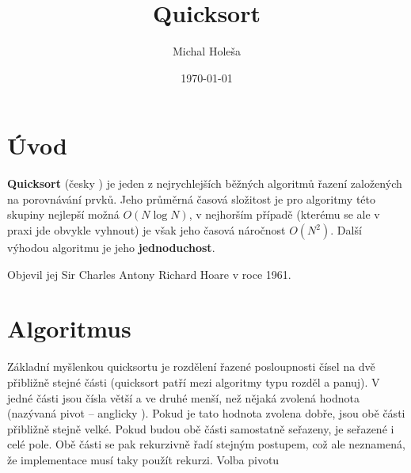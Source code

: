 \documentclass{article}
\title{Quicksort}
\author{Michal Holeša}  %
\date{\today}
\begin{document}
\maketitle


\section{Úvod}
\textbf{Quicksort} (česky ) je jeden z nejrychlejších běžných algoritmů řazení založených na porovnávání prvků. Jeho průměrná časová složitost je pro algoritmy této skupiny nejlepší možná $O(N \log N)$, v nejhorším případě (kterému se ale v praxi jde obvykle vyhnout) je však jeho časová náročnost $O(N^{2})$. Další výhodou algoritmu je jeho \textbf{jednoduchost}.

Objevil jej Sir Charles Antony Richard Hoare v roce 1961.

\section{Algoritmus}
Základní myšlenkou quicksortu je rozdělení řazené posloupnosti čísel na dvě přibližně stejné části (quicksort patří mezi algoritmy typu rozděl a panuj). V jedné části jsou čísla větší a ve druhé menší, než nějaká zvolená hodnota (nazývaná pivot – anglicky ). Pokud je tato hodnota zvolena dobře, jsou obě části přibližně stejně velké. Pokud budou obě části samostatně seřazeny, je seřazené i celé pole. Obě části se pak rekurzivně řadí stejným postupem, což ale neznamená, že implementace musí taky použít rekurzi.
Volba pivotu
\end{document}
